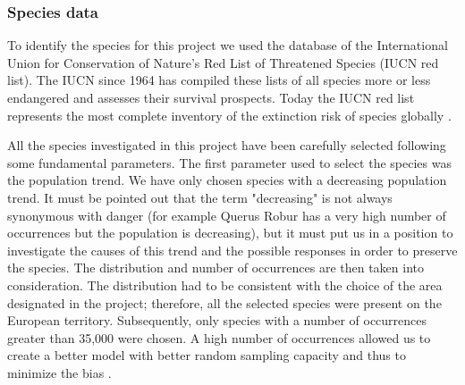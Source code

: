 \documentclass[12pt,a4paper]{article}
\begin{document}
\subsubsection{Species data}
To identify the species for this project we used the database of the International Union for Conservation of Nature's Red List of Threatened Species (IUCN red list).
The IUCN since 1964 has compiled these lists of all species more or less endangered and assesses their survival prospects. Today the IUCN red list represents the most complete inventory of the extinction risk of species globally \citep {IUCN}.

All the species investigated in this project have been carefully selected following some fundamental parameters.
The first parameter used to select the species was the population trend. We have only chosen species with a decreasing population trend. It must be pointed out that the term "decreasing" is not always synonymous with danger (for example Querus Robur has a very high number of occurrences but the population is decreasing), but it must put us in a position to investigate the causes of this trend and the possible responses in order to preserve the species.
The distribution and number of occurrences are then taken into consideration. The distribution had to be consistent with the choice of the area designated in the project; therefore, all the selected species were present on the European territory. Subsequently, only species with a number of occurrences greater than 35,000 were chosen. A high number of occurrences allowed us to create a better model with better random sampling capacity and thus to minimize the bias \citep {kaplan} .
\end{document}
